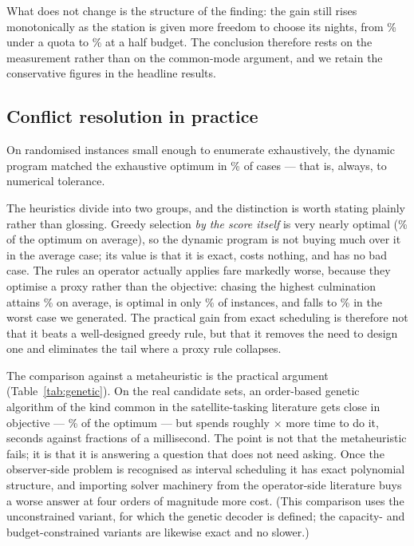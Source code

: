\documentclass[conference]{IEEEtran}
\begin{document}
What does not change is the structure of the finding: the gain still rises
monotonically as the station is given more freedom to choose its nights, from
\HistQuotaClear\% under a quota to \HistBudgetClear\% at a half budget. The
conclusion therefore rests on the measurement rather than on the common-mode
argument, and we retain the conservative figures in the headline results.

\subsection{Conflict resolution in practice}
\label{sec:schedresults}




On \SchedTrials{} randomised instances small enough to enumerate exhaustively,
the dynamic program matched the exhaustive optimum in \DPOptimalPct\% of cases
--- that is, always, to numerical tolerance.

The heuristics divide into two groups, and the distinction is worth stating
plainly rather than glossing. Greedy selection \emph{by the score itself} is
very nearly optimal (\GreedyValuePct\% of the optimum on average), so the
dynamic program is not buying much over it in the average case; its value is
that it is exact, costs nothing, and has no bad case. The rules an operator
actually applies fare markedly worse, because they optimise a proxy rather than
the objective: chasing the highest culmination attains \GreedyElevPct\% on
average, is optimal in only \GreedyElevOptPct\% of instances, and falls to
\GreedyElevMin\% in the worst case we generated. The practical gain from exact
scheduling is therefore not that it beats a well-designed greedy rule, but that
it removes the need to design one and eliminates the tail where a proxy rule
collapses.

The comparison against a metaheuristic is the practical argument
(Table~\ref{tab:genetic}). On the real candidate sets, an order-based genetic
algorithm of the kind common in the satellite-tasking literature gets close in
objective --- \GAPct\% of the optimum --- but spends roughly
\GASlowdown$\times$ more time to do it, seconds against fractions of a
millisecond. The point is not that the metaheuristic fails; it is that it is
answering a question that does not need asking. Once the observer-side problem
is recognised as interval scheduling it has exact polynomial structure, and
importing solver machinery from the operator-side literature buys a worse answer
at four orders of magnitude more cost. (This comparison uses the unconstrained
variant, for which the genetic decoder is defined; the capacity- and
budget-constrained variants are likewise exact and no slower.)
\end{document}
